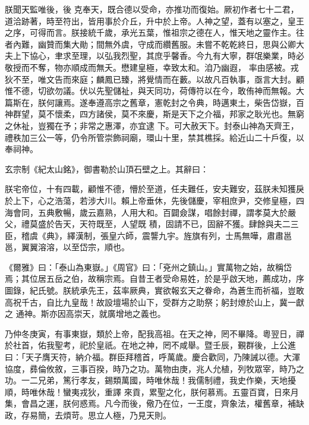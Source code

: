 \begin{pinyinscope}
 朕聞天監唯後，後
 克奉天，既合德以受命，亦推功而復始。厥初作者七十二君，道洽跡著，時至符出，皆用事於介丘，升中於上帝。人神之望，蓋有以塞之，皇王之序，可得而言。朕接統千歲，承光五葉，惟祖宗之德在人，惟天地之靈作主。往者內難，幽贊而集大勛；間無外虞，守成而纘舊服。未嘗不乾乾終日，思與公卿大夫上下協心，聿求至理，以弘我烈聖，其庶乎馨香。今九有大寧，群氓樂業，時必敬授而不奪，物亦順成而無夭。懋建皇極，幸致太和。洎乃幽遐，
 率由感被。戎狄不至，唯文告而來庭；麟鳳已臻，將覺情而在藪。以故凡百執事，亟言大封。顧惟不德，切欲勿議。伏以先聖儲祉，與天同功，荷傳符以在今，敢侑神而無報。大篇斯在，朕何讓焉。遂奉遵高宗之舊章，憲乾封之令典，時邁東土，柴告岱嶽，百神群望，莫不懷柔，四方諸侯，莫不來慶，斯是天下之介福，邦家之耿光也。無窮之休祉，豈獨在予；非常之惠澤，亦宜逮
 下。可大赦天下。封泰山神為天齊王，禮秩加三公一等，仍令所管崇飾祠廟，環山十里，禁其樵採。給近山二十戶復，以奉祠神。



 玄宗制《紀太山銘》，御書勒於山頂石壁之上。其辭曰：



 朕宅帝位，十有四載，顧惟不德，懵於至道，任夫難任，安夫難安，茲朕未知獲戾於上下，心之浩蕩，若涉大川。賴上帝垂休，先後儲慶，宰相庶尹，交修皇極，四海會同，五典敷暢，歲云嘉熟，人用大和。百闢僉謀，唱餘封禪，謂孝莫大於嚴父，禮莫盛於告天，天符既至，人望既
 積，固請不已，固辭不獲。肆餘與夫二三臣，稽虞《典》，繹漢制，張皇六師，震讋九宇。旌旗有列，士馬無嘩，肅肅邕邕，翼翼溶溶，以至岱宗，順也。



 《爾雅》曰：「泰山為東嶽。」《周官》曰：「兗州之鎮山。」實萬物之始，故稱岱焉；其位居五岳之伯，故稱宗焉。自昔王者受命易姓，於是乎啟天地，薦成功，序圖錄，紀氏號。朕統承先王，茲率厥典，實欲報玄天之眷命，為蒼生而祈福，豈敢高祝千古，自比九皇哉！故設壇場於山下，受群方之助祭；躬封燎於山上，冀一獻之
 通神。斯亦因高崇天，就廣增地之義也。



 乃仲冬庚寅，有事東嶽，類於上帝，配我高祖。在天之神，罔不畢降。粵翌日，禪於社首，佑我聖考，祀於皇祇。在地之神，罔不咸舉。暨壬辰，覲群後，上公進曰：「天子膺天符，納介福。群臣拜稽首，呼萬歲。慶合歡同，乃陳誡以德。大渾協度，彞倫攸敘，三事百揆，時乃之功。萬物由庚，兆人允植，列牧眾宰，時乃之功。一二兄弟，篤行孝友，錫類萬國，時唯休哉！我儒制禮，我史作樂，天地擾順，時唯休哉！蠻夷戎狄，重譯
 來貢，累聖之化，朕何慕焉。五靈百寶，日來月集，會昌之運，朕何惑焉。凡今而後，儆乃在位，一王度，齊象法，權舊章，補缺政，存易簡，去煩苛。思立人極，乃見天則。




\end{pinyinscope}
